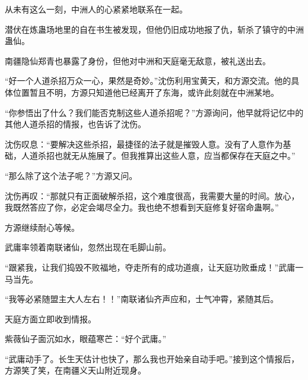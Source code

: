 \begin{this_body}
从未有这么一刻，中洲人的心紧紧地联系在一起。

潜伏在炼蛊场地里的自在书生被发现，但他仍旧成功地报了仇，斩杀了镇守的中洲蛊仙。

南疆隐仙郑青也暴露了身份，但他对中洲和天庭毫无敌意，被礼送出去。

“好一个人道杀招万众一心，果然是奇妙。”沈伤利用宝黄天，和方源交流。他的具体位置暂且不明，方源只知道他已经离开了东海，或许此刻就在中洲某地。

“你参悟出了什么？我们能否克制这些人道杀招呢？”方源询问，他早就将记忆中的其他人道杀招的情报，也告诉了沈伤。

沈伤叹息：“要解决这些杀招，最捷径的法子就是摧毁人意。没有了人意作为基础，人道杀招也就无从施展了。但我推算出这些人意，应当都保存在天庭之中。”

“那么除了这个法子呢？”方源又问。

沈伤再叹：“那就只有正面破解杀招，这个难度很高，我需要大量的时间。放心，我既然答应了你，必定会竭尽全力。我也绝不想看到天庭修复好宿命蛊啊。”

方源继续耐心等候。

武庸率领着南联诸仙，忽然出现在毛脚山前。

“跟紧我，让我们捣毁不败福地，夺走所有的成功道痕，让天庭功败垂成！”武庸一马当先。

“我等必紧随盟主大人左右！！”南联诸仙齐声应和，士气冲霄，紧随其后。

天庭方面立即收到情报。

紫薇仙子面沉如水，眼蕴寒芒：“好个武庸。”

“武庸动手了。长生天估计也快了，那么我也开始亲自动手吧。”接到这个情报后，方源笑了笑，在南疆义天山附近现身。

\end{this_body}

